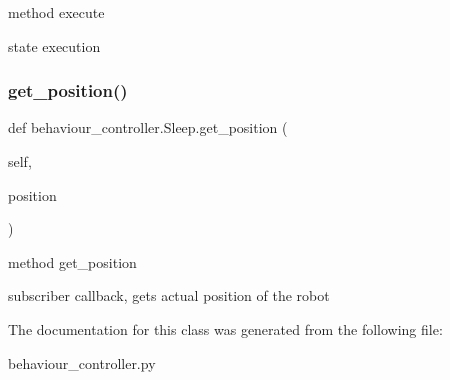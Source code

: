 method execute 

state execution \mbox{\label{classbehaviour__controller_1_1Sleep_aebc97332fedcc5dc6f72c799d002088f}} 
\subsubsection{\texorpdfstring{get\+\_\+position()}{get\_position()}}
{\footnotesize\ttfamily def behaviour\+\_\+controller.\+Sleep.\+get\+\_\+position (\begin{DoxyParamCaption}\item[{}]{self,  }\item[{}]{position }\end{DoxyParamCaption})}



method get\+\_\+position 

subscriber callback, gets actual position of the robot 

The documentation for this class was generated from the following file\+:\begin{DoxyCompactItemize}
\item 
behaviour\+\_\+controller.\+py\end{DoxyCompactItemize}
